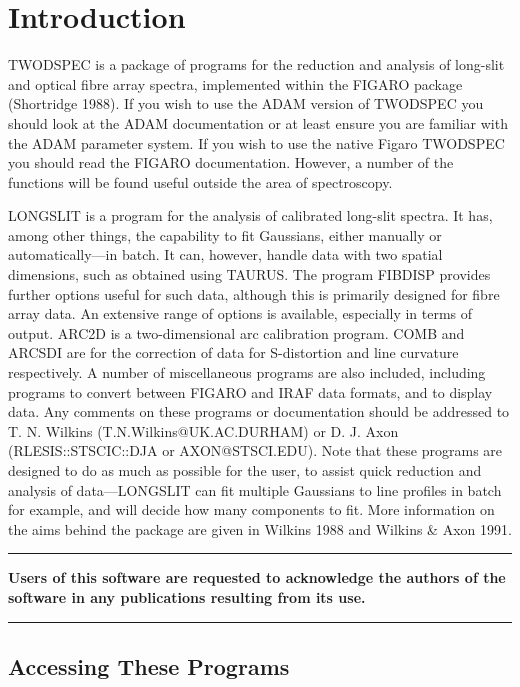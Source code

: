 \newpage
\section{Introduction}

TWODSPEC is a package of programs for the reduction and analysis of
long-slit and optical fibre array spectra, implemented within the FIGARO
package (Shortridge 1988).
If you wish to use the ADAM version of TWODSPEC you should look at the
ADAM documentation or at least ensure you are familiar with the ADAM
parameter system.
If you wish to use the native Figaro TWODSPEC you should read the
FIGARO documentation.
However, a number of the functions will be found useful outside the area
of spectroscopy.

LONGSLIT is a program for the analysis of calibrated long-slit spectra.
It has, among other things, the capability to fit Gaussians, either
manually or automatically---in batch.
It can, however, handle data with two spatial dimensions, such as
obtained using TAURUS.
The program FIBDISP provides further options useful for such data,
although this is primarily designed for fibre array data.
An extensive range of options is available, especially in terms of
output.
ARC2D is a two-dimensional arc calibration program.
COMB and ARCSDI are for the correction of data for S-distortion and line
curvature respectively.
A number of miscellaneous programs are also included, including programs
to convert between FIGARO and IRAF data formats, and to display data.
Any comments on these programs or documentation should be addressed to
T. N. Wilkins (T.N.Wilkins@UK.AC.DURHAM) or D. J. Axon
(RLESIS::STSCIC::DJA or AXON@STSCI.EDU).
Note that these programs are designed to do as much as possible for the
user, to assist quick reduction and analysis of data---LONGSLIT can fit
multiple Gaussians to line profiles in batch for example, and will
decide how many components to fit.
More information on the aims behind the package are given in Wilkins
1988 and Wilkins \& Axon 1991.
\vspace*{3mm}
\rule{\textwidth}{0.5mm}
\begin{center}
{\large\bf Users of this software are requested to acknowledge the
authors of the software in any publications resulting from its use.}
\end{center}
\rule{\textwidth}{0.5mm}
\vspace*{3mm}

\subsection{Accessing These Programs}

